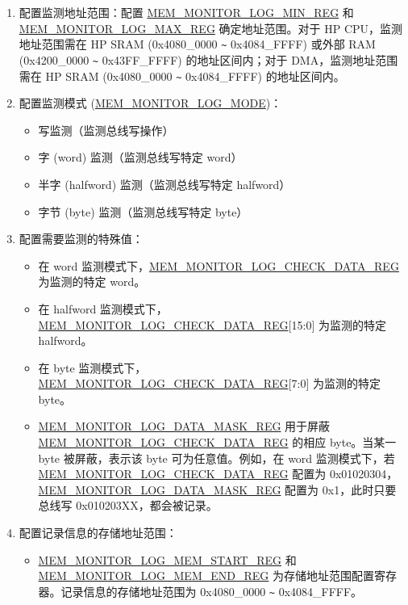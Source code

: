 \documentclass[main\_\_CN.tex]{subfiles}
\begin{document}
\begin{enumerate}
    \item 配置监测地址范围：配置 \hyperref[regdesc:MEMMONITORLOGMINREG]{MEM\_MONITOR\_LOG\_MIN\_REG} 和 \hyperref[regdesc:MEMMONITORLOGMAXREG]{MEM\_MONITOR\_LOG\_MAX\_REG} 确定地址范围。对于 HP CPU，监测地址范围需在 HP SRAM (0x4080\_0000 \verb+~+ 0x4084\_FFFF) 或外部 RAM (0x4200\_0000 \verb+~+ 0x43FF\_FFFF) 的地址区间内；对于 DMA，监测地址范围需在 HP SRAM (0x4080\_0000 \verb+~+ 0x4084\_FFFF) 的地址区间内。
    \item 配置监测模式 (\hyperref[fielddesc:MEMMONITORLOGMODE]{MEM\_MONITOR\_LOG\_MODE})：
        \begin{itemize}
            \item 写监测（监测总线写操作）
            \item 字 (word) 监测（监测总线写特定 word）
            \item 半字 (halfword) 监测（监测总线写特定 halfword）
            \item 字节 (byte) 监测（监测总线写特定 byte）
        \end{itemize}
    \item 配置需要监测的特殊值：
        \begin{itemize}
            \item 在 word 监测模式下，\hyperref[regdesc:MEMMONITORLOGCHECKDATAREG]{MEM\_MONITOR\_LOG\_CHECK\_DATA\_REG} 为监测的特定 word。
            \item 在 halfword 监测模式下，\hyperref[regdesc:MEMMONITORLOGCHECKDATAREG]{MEM\_MONITOR\_LOG\_CHECK\_DATA\_REG}[15:0] 为监测的特定 halfword。
            \item 在 byte 监测模式下，\hyperref[regdesc:MEMMONITORLOGCHECKDATAREG]{MEM\_MONITOR\_LOG\_CHECK\_DATA\_REG}[7:0] 为监测的特定 byte。
            \item \hyperref[regdesc:MEMMONITORLOGDATAMASKREG]{MEM\_MONITOR\_LOG\_DATA\_MASK\_REG} 用于屏蔽 \hyperref[regdesc:MEMMONITORLOGCHECKDATAREG]{MEM\_MONITOR\_LOG\_CHECK\_DATA\_REG} 的相应 byte。当某一 byte 被屏蔽，表示该 byte 可为任意值。例如，在 word 监测模式下，若 \hyperref[regdesc:MEMMONITORLOGCHECKDATAREG]{MEM\_MONITOR\_LOG\_CHECK\_DATA\_REG} 配置为 0x01020304，\hyperref[regdesc:MEMMONITORLOGDATAMASKREG]{MEM\_MONITOR\_LOG\_DATA\_MASK\_REG} 配置为 0x1，此时只要总线写 0x010203XX，都会被记录。
        \end{itemize}
    \item 配置记录信息的存储地址范围：
        \begin{itemize}
            \item \hyperref[regdesc:MEMMONITORLOGMEMSTARTREG]{MEM\_MONITOR\_LOG\_MEM\_START\_REG} 和 \hyperref[regdesc:MEMMONITORLOGMEMENDREG]{MEM\_MONITOR\_LOG\_MEM\_END\_REG} 为存储地址范围配置寄存器。记录信息的存储地址范围为 0x4080\_0000 \verb+~+ 0x4084\_FFFF。

\end{itemize}
\end{enumerate}
\end{document}
